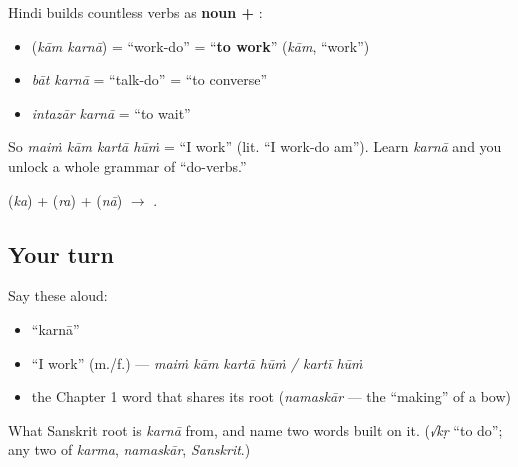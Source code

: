 \begin{grammarlens}[title={Grammar Lens: \hi{करना} makes verbs out of anything}]
Hindi builds countless verbs as \textbf{noun + }:

\begin{itemize}
\raggedright
  \item \textbf{ } (\emph{kām karnā}) = \textquotedblleft{}work-do\textquotedblright{} = \textquotedblleft{}\textbf{to work}\textquotedblright{} (\emph{kām}, \textquotedblleft{}work\textquotedblright{})
  \item \emph{bāt karnā} = \textquotedblleft{}talk-do\textquotedblright{} = \textquotedblleft{}to converse\textquotedblright{}
  \item \emph{intazār karnā} = \textquotedblleft{}to wait\textquotedblright{}
\end{itemize}

So \emph{maiṁ kām kartā hūṁ} = \textquotedblleft{}I work\textquotedblright{} (lit. \textquotedblleft{}I work-do am\textquotedblright{}). Learn \emph{karnā} and you unlock a whole grammar of \textquotedblleft{}do-verbs.\textquotedblright{}
\end{grammarlens}

\begin{sounds}
 (\emph{ka}) +  (\emph{ra}) +  (\emph{nā}) $\to$ .
\end{sounds}

\subsection*{Your turn}
Say these aloud:

\begin{itemize}
\raggedright
  \item \textquotedblleft{}karnā\textquotedblright{}
  \item \textquotedblleft{}I work\textquotedblright{} (m./f.) — \emph{maiṁ kām kartā hūṁ / kartī hūṁ}
  \item the Chapter 1 word that shares its root (\emph{namaskār} — the \textquotedblleft{}making\textquotedblright{} of a bow)
\end{itemize}

\begin{tcolorbox}[breakable,colback=teal!4,colframe=teal!35!black,title={Before you move on}]
What Sanskrit root is \emph{karnā} from, and name two words built on it. (\emph{√kṛ} \textquotedblleft{}to do\textquotedblright{}; any two of \emph{karma}, \emph{namaskār}, \emph{Sanskrit}.)
\end{tcolorbox}
